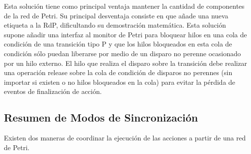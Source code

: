 Esta solución tiene como principal ventaja mantener la cantidad de componentes
de la red de Petri.
Su principal desventaja consiste en que añade una nueva etiqueta a la
RdP, dificultando su demostración matemática. Esta solución supone añadir
una interfaz al monitor de Petri para bloquear hilos en una cola de condición de
una transición tipo P y que los hilos bloqueados en esta cola de condición sólo
puedan liberarse por medio de un disparo no perenne ocasionado por un hilo
externo.
El hilo que realiza el disparo sobre la transición debe realizar una operación
release sobre la cola de condición de disparos no perennes (sin importar si
existen o no hilos bloqueados en la cola) para evitar la pérdida de eventos de
finalización de acción.

\subsection{Resumen de Modos de Sincronización}
\label{sec:resumen_sincronizacion}
Existen dos maneras de coordinar la ejecución de las acciones a partir de una
red de Petri.\\ 
